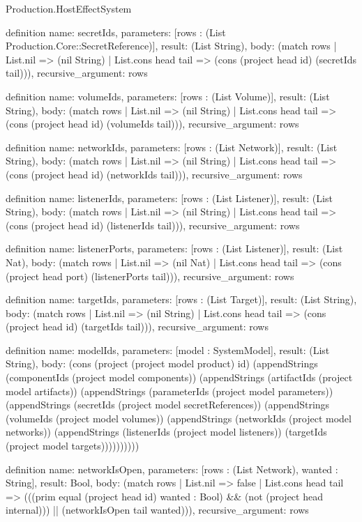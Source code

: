 \begin{lexlean}{Production.HostEffectSystem}
\begin{semanticmodule}
definition{
  name: secretIds,
  parameters: [rows : (List Production.Core::SecretReference)],
  result: (List String),
  body: (match rows
    | List.nil => (nil String)
    | List.cons head tail => (cons (project head id) (secretIds tail))),
  recursive_argument: rows
}

definition{
  name: volumeIds,
  parameters: [rows : (List Volume)],
  result: (List String),
  body: (match rows
    | List.nil => (nil String)
    | List.cons head tail => (cons (project head id) (volumeIds tail))),
  recursive_argument: rows
}

definition{
  name: networkIds,
  parameters: [rows : (List Network)],
  result: (List String),
  body: (match rows
    | List.nil => (nil String)
    | List.cons head tail => (cons (project head id) (networkIds tail))),
  recursive_argument: rows
}

definition{
  name: listenerIds,
  parameters: [rows : (List Listener)],
  result: (List String),
  body: (match rows
    | List.nil => (nil String)
    | List.cons head tail => (cons (project head id) (listenerIds tail))),
  recursive_argument: rows
}

definition{
  name: listenerPorts,
  parameters: [rows : (List Listener)],
  result: (List Nat),
  body: (match rows
    | List.nil => (nil Nat)
    | List.cons head tail => (cons (project head port) (listenerPorts tail))),
  recursive_argument: rows
}

definition{
  name: targetIds,
  parameters: [rows : (List Target)],
  result: (List String),
  body: (match rows
    | List.nil => (nil String)
    | List.cons head tail => (cons (project head id) (targetIds tail))),
  recursive_argument: rows
}

definition{
  name: modelIds,
  parameters: [model : SystemModel],
  result: (List String),
  body: (cons (project (project model product) id) (appendStrings (componentIds (project model components)) (appendStrings (artifactIds (project model artifacts)) (appendStrings (parameterIds (project model parameters)) (appendStrings (secretIds (project model secretReferences)) (appendStrings (volumeIds (project model volumes)) (appendStrings (networkIds (project model networks)) (appendStrings (listenerIds (project model listeners)) (targetIds (project model targets))))))))))
}

definition{
  name: networkIsOpen,
  parameters: [rows : (List Network), wanted : String],
  result: Bool,
  body: (match rows
    | List.nil => false
    | List.cons head tail => (((prim equal (project head id) wanted : Bool) && (not (project head internal))) || (networkIsOpen tail wanted))),
  recursive_argument: rows
}


\end{semanticmodule}
\end{lexlean}
